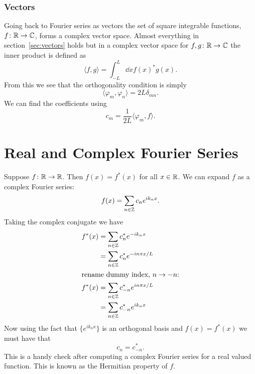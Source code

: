 \documentclass[a4paper]{article}
\renewcommand{\innerproduct}[2]{\langle {#1} , {#2} \rangle}
\begin{document}
    \subsubsection{Vectors}
    Going back to Fourier series as vectors the set of square integrable functions, \(f\colon\mathbb{R}\to\mathbb{C}\), forms a complex vector space.
    Almost everything in section~\ref{sec:vectors} holds but in a complex vector space for \(f, g\colon\mathbb{R}\to\mathbb{C}\) the inner product is defined as
    \[\innerproduct{f}{g} = \int_{-L}^{L} \dd{x} f(x)^*g(x).\]
    From this we see that the orthogonality condition is simply
    \[\innerproduct{\varphi_m}{\varphi_n} = 2L\delta_{mn}.\]
    We can find the coefficients using
    \[c_m = \frac{1}{2L}\innerproduct{\varphi_m}{f}.\]
    
    \section{Real and Complex Fourier Series}
    Suppose \(f\colon\mathbb{R}\to\mathbb{R}\).
    Then \(f(x) = f^*(x)\) for all \(x\in\mathbb{R}\).
    We can expand \(f\) as a complex Fourier series:
    \[f(x) = \sum_{n\in\mathbb{Z}}c_ne^{ik_nx}.\]
    Taking the complex conjugate we have
    \begin{align*}
        f^*(x) &= \sum_{n\in\mathbb{Z}}c_n^*e^{-ik_nx}\\
        &= \sum_{n\in\mathbb{Z}}c_n^*e^{-in\pi x/L}\\
        \shortintertext{rename dummy index, \(n\to-n\):}
        f^*(x) &= \sum_{n\in\mathbb{Z}}c_{-n}^*e^{in\pi x/L}\\
        &= \sum_{n\in\mathbb{Z}}c_{-n}^*e^{ik_nx}\\
    \end{align*}
    Now using the fact that \(\{e^{ik_nx}\}\) is an orthogonal basis and \(f(x) = f^*(x)\) we must have that
    \[c_n = c_{-n}^*.\]
    This is a handy check after computing a complex Fourier series for a real valued function.
    This is known as the Hermitian property of \(f\).
    
\end{document}

